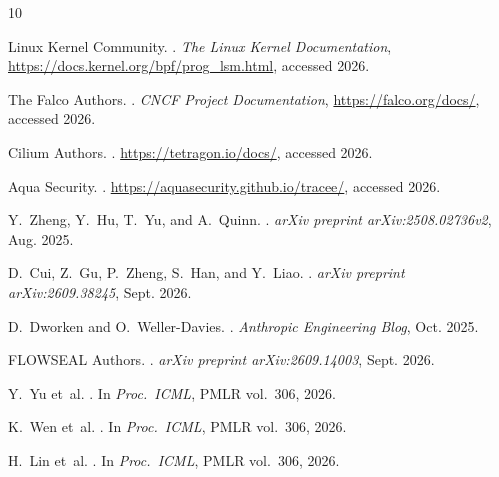 \documentclass[10pt,twocolumn,letterpaper]{article}
\begin{document}
\footnotesize
\begin{thebibliography}{10}

Linux Kernel Community.
.
\newblock \emph{The Linux Kernel Documentation}, \url{https://docs.kernel.org/bpf/prog_lsm.html}, accessed 2026.

The Falco Authors.
.
\newblock \emph{CNCF Project Documentation}, \url{https://falco.org/docs/}, accessed 2026.

Cilium Authors.
.
\newblock \url{https://tetragon.io/docs/}, accessed 2026.

Aqua Security.
.
\newblock \url{https://aquasecurity.github.io/tracee/}, accessed 2026.

Y.~Zheng, Y.~Hu, T.~Yu, and A.~Quinn.
.
\newblock \emph{arXiv preprint arXiv:2508.02736v2}, Aug. 2025.

D.~Cui, Z.~Gu, P.~Zheng, S.~Han, and Y.~Liao.
.
\newblock \emph{arXiv preprint arXiv:2609.38245}, Sept. 2026.

D.~Dworken and O.~Weller-Davies.
.
\newblock \emph{Anthropic Engineering Blog}, Oct. 2025.

FLOWSEAL Authors.
.
\newblock \emph{arXiv preprint arXiv:2609.14003}, Sept. 2026.

Y.~Yu et~al.
.
\newblock In \emph{Proc.\ ICML}, PMLR vol.~306, 2026.

K.~Wen et~al.
.
\newblock In \emph{Proc.\ ICML}, PMLR vol.~306, 2026.

H.~Lin et~al.
.
\newblock In \emph{Proc.\ ICML}, PMLR vol.~306, 2026.


\end{thebibliography}
\end{document}
